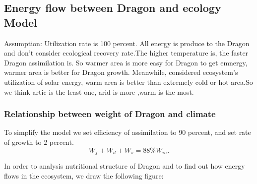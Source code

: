 \documentclass[12pt]{article}
\begin{document}
\subsection{Energy flow between Dragon and ecology Model}%
Assumption: Utilization rate is 100 percent. All energy is produce to the Dragon and don't consider ecological recovery rate.The higher temperature is, the faster Dragon assimilation is. So warmer area is more easy for Dragon to get emnergy, warmer area is better for Dragon growth. Meanwhile, considered ecosystem's utilization of solar energy, warm area is better than extremely cold or hot area.So we think artic is the least one, arid is more ,warm is the most.
\subsubsection{Relationship between weight of Dragon and climate}%
To simplify the model we set efficiency of assimilation to 90 percent, and set rate of growth to 2 percent.
\begin{equation}
	W_f+W_d+W_s=88\%W_{in} .	%
\end{equation}

In order to analysis nutritional structure of Dragon and to find out how energy flows in the ecosystem, we draw the following figure:
\end{document}
